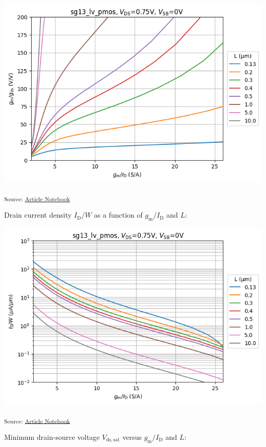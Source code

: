 \documentclass[
  a4paper,
  DIV=11,
  numbers=noendperiod]{scrartcl}
\begin{document}
\includegraphics{index_files/figure-latex/.-sizing-techsweep_sg13_plots_pmos-cell-10-output-1.png}

\textsubscript{Source:
\href{https://iic-jku.github.io/analog-circuit-design/index.qmd.html}{Article
Notebook}}

Drain current density \(I_\mathrm{D}/W\) as a function of
\(g_\mathrm{m}/I_\mathrm{D}\) and \(L\):

\includegraphics{index_files/figure-latex/.-sizing-techsweep_sg13_plots_pmos-cell-11-output-1.png}

\textsubscript{Source:
\href{https://iic-jku.github.io/analog-circuit-design/index.qmd.html}{Article
Notebook}}

Minimum drain-source voltage \(V_\mathrm{ds,sat}\) versus
\(g_\mathrm{m}/I_\mathrm{D}\) and \(L\):
\end{document}
